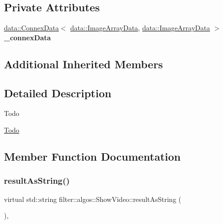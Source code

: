 \subsection*{Private Attributes}
\begin{DoxyCompactItemize}
\item 
\mbox{\label{classfilter_1_1algos_1_1_show_video_a6f6d66c5bfd5a29ed0b5ddf22660043a}} 
\hyperlink{classfilter_1_1data_1_1_connex_data}{data\+::\+Connex\+Data}$<$ \hyperlink{classfilter_1_1data_1_1_image_array_data}{data\+::\+Image\+Array\+Data}, \hyperlink{classfilter_1_1data_1_1_image_array_data}{data\+::\+Image\+Array\+Data} $>$ {\bfseries \+\_\+connex\+Data}
\end{DoxyCompactItemize}
\subsection*{Additional Inherited Members}


\subsection{Detailed Description}
\begin{DoxyRefDesc}{Todo}
\item[\hyperlink{todo__todo000015}{Todo}]\end{DoxyRefDesc}


\subsection{Member Function Documentation}
\mbox{\label{classfilter_1_1algos_1_1_show_video_a8fc9113fbd7f9648ea0997304ca91aec}} 
\subsubsection{\texorpdfstring{result\+As\+String()}{resultAsString()}}
{\footnotesize\ttfamily virtual std\+::string filter\+::algos\+::\+Show\+Video\+::result\+As\+String (\begin{DoxyParamCaption}{ }\end{DoxyParamCaption})\hspace{0.3cm}{\ttfamily [inline]}, {\ttfamily [virtual]}}

